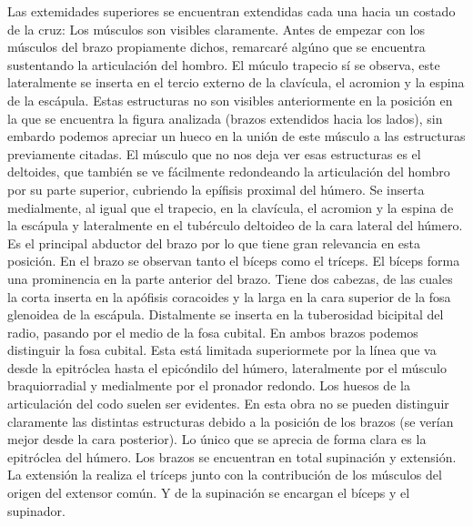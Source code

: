 Las extemidades superiores se encuentran extendidas cada una hacia un costado de la cruz: Los músculos son visibles claramente. Antes de empezar con los músculos del brazo propiamente dichos, remarcaré algúno que se encuentra sustentando la articulación del hombro. El múculo trapecio sí se observa, este lateralmente se inserta en el tercio externo de la clavícula, el acromion y la espina de la escápula. Estas estructuras no son visibles anteriormente en la posición en la que se encuentra la figura analizada (brazos extendidos hacia los lados), sin embardo podemos apreciar un hueco en la unión de este músculo a las estructuras previamente citadas. El músculo que no nos deja ver esas estructuras es el deltoides, que también se ve fácilmente redondeando la articulación del hombro por su parte superior, cubriendo la epífisis proximal del húmero. Se inserta medialmente, al igual que el trapecio, en la clavícula, el acromion y la espina de la escápula y lateralmente en el tubérculo deltoideo de la cara lateral del húmero. Es el principal abductor del brazo por lo que tiene gran relevancia en esta posición.
En el brazo se observan tanto el bíceps como el tríceps. El bíceps forma una prominencia en la parte anterior del brazo. Tiene dos cabezas, de las cuales la corta inserta en la apófisis coracoides y la larga en la cara superior de la fosa glenoidea de la escápula. Distalmente se inserta en la tuberosidad bicipital del radio, pasando por el medio de la fosa cubital.
En ambos brazos podemos distinguir la fosa cubital. Esta está limitada superiormete por la línea que va desde la epitróclea hasta el epicóndilo del húmero, lateralmente por el músculo braquiorradial y medialmente por el pronador redondo.
Los huesos de la articulación del codo suelen ser evidentes. En esta obra no se pueden distinguir claramente las distintas estructuras debido a la posición de los brazos (se verían mejor desde la cara posterior). Lo único que se aprecia de forma clara es la epitróclea del húmero.
Los brazos se encuentran en total supinación y extensión. La extensión la realiza el tríceps junto con la contribución de los músculos del origen del extensor común. Y de la supinación se encargan el bíceps y el supinador.

